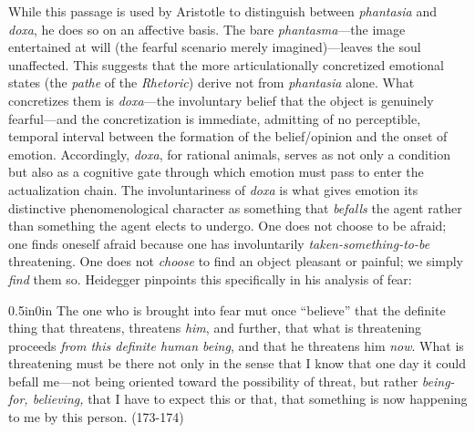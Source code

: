 \documentclass{article}
\begin{document}
While this passage is used by Aristotle to distinguish between \textit{phantasia} and \textit{doxa}, he does so on an affective basis. The bare \textit{phantasma}---the image entertained at will (the fearful scenario merely imagined)---leaves the soul unaffected. This suggests that the more articulationally concretized emotional states (the \textit{pathe} of the \textit{Rhetoric}) derive not from \textit{phantasia} alone. What concretizes them is \textit{doxa}---the involuntary belief that the object is genuinely fearful---and the concretization is immediate, admitting of no perceptible, temporal interval between the formation of the belief/opinion and the onset of emotion. Accordingly, \textit{doxa}, for rational animals, serves as not only a condition but also as a cognitive gate through which emotion must pass to enter the actualization chain. The involuntariness of \textit{doxa} is what gives emotion its distinctive phenomenological character as something that \textit{befalls} the agent rather than something the agent elects to undergo. One does not choose to be afraid; one finds oneself afraid because one has involuntarily \textit{taken-something-to-be} threatening. One does not \textit{choose} to find an object pleasant or painful; we simply \textit{find} them so. Heidegger pinpoints this specifically in his analysis of fear: 
\begin{adjustwidth}{0.5in}{0in}
    The one who is brought into fear mut once ``believe'' that the definite thing that threatens, threatens \textit{him}, and further, that what is threatening proceeds \textit{from this definite human being}, and that he threatens him \textit{now}. What is threatening must be there not only in the sense that I know that one day it could befall me---not being oriented toward the possibility of threat, but rather \textit{being-for, believing,} that I have to expect this or that, that something is now happening to me by this person. (173-174)
\end{adjustwidth}
\end{document}
